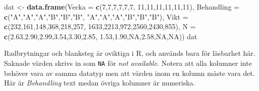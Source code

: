 \documentclass[
]{book}
\newenvironment{Shaded}{\begin{snugshade}}{\end{snugshade}}
\newcommand{\AttributeTok}[1]{\textcolor[rgb]{0.13,0.29,0.53}{#1}}
\newcommand{\ConstantTok}[1]{\textcolor[rgb]{0.56,0.35,0.01}{#1}}
\newcommand{\DecValTok}[1]{\textcolor[rgb]{0.00,0.00,0.81}{#1}}
\newcommand{\FloatTok}[1]{\textcolor[rgb]{0.00,0.00,0.81}{#1}}
\newcommand{\FunctionTok}[1]{\textcolor[rgb]{0.13,0.29,0.53}{\textbf{#1}}}
\newcommand{\NormalTok}[1]{#1}
\newcommand{\OtherTok}[1]{\textcolor[rgb]{0.56,0.35,0.01}{#1}}
\newcommand{\StringTok}[1]{\textcolor[rgb]{0.31,0.60,0.02}{#1}}
\theoremstyle{definition}
\theoremstyle{definition}
\theoremstyle{definition}
\theoremstyle{definition}
\theoremstyle{remark}
\begin{document}
\begin{Shaded}
\begin{Highlighting}[]
\NormalTok{dat }\OtherTok{\textless{}{-}} \FunctionTok{data.frame}\NormalTok{(}\AttributeTok{Vecka =} \FunctionTok{c}\NormalTok{(}\DecValTok{7}\NormalTok{,}\DecValTok{7}\NormalTok{,}\DecValTok{7}\NormalTok{,}\DecValTok{7}\NormalTok{,}\DecValTok{7}\NormalTok{,}\DecValTok{7}\NormalTok{,}
                            \DecValTok{11}\NormalTok{,}\DecValTok{11}\NormalTok{,}\DecValTok{11}\NormalTok{,}\DecValTok{11}\NormalTok{,}\DecValTok{11}\NormalTok{,}\DecValTok{11}\NormalTok{),}
                  \AttributeTok{Behandling =} \FunctionTok{c}\NormalTok{(}\StringTok{"A"}\NormalTok{,}\StringTok{"A"}\NormalTok{,}\StringTok{"A"}\NormalTok{,}\StringTok{"B"}\NormalTok{,}\StringTok{"B"}\NormalTok{,}\StringTok{"B"}\NormalTok{,}
                                 \StringTok{"A"}\NormalTok{,}\StringTok{"A"}\NormalTok{,}\StringTok{"A"}\NormalTok{,}\StringTok{"B"}\NormalTok{,}\StringTok{"B"}\NormalTok{,}\StringTok{"B"}\NormalTok{),}
                  \AttributeTok{Vikt =} \FunctionTok{c}\NormalTok{(}\DecValTok{232}\NormalTok{,}\DecValTok{161}\NormalTok{,}\DecValTok{148}\NormalTok{,}\DecValTok{368}\NormalTok{,}\DecValTok{218}\NormalTok{,}\DecValTok{257}\NormalTok{,}
                           \DecValTok{1633}\NormalTok{,}\DecValTok{2213}\NormalTok{,}\DecValTok{972}\NormalTok{,}\DecValTok{2560}\NormalTok{,}\DecValTok{2430}\NormalTok{,}\DecValTok{855}\NormalTok{),}
                  \AttributeTok{N =} \FunctionTok{c}\NormalTok{(}\FloatTok{2.63}\NormalTok{,}\FloatTok{2.90}\NormalTok{,}\FloatTok{2.99}\NormalTok{,}\FloatTok{3.54}\NormalTok{,}\FloatTok{3.30}\NormalTok{,}\FloatTok{2.85}\NormalTok{,}
                        \FloatTok{1.53}\NormalTok{,}\FloatTok{1.90}\NormalTok{,}\ConstantTok{NA}\NormalTok{,}\FloatTok{2.58}\NormalTok{,}\ConstantTok{NA}\NormalTok{,}\ConstantTok{NA}\NormalTok{))}
\NormalTok{dat}
\end{Highlighting}
\end{Shaded}

Radbrytningar och blanksteg är oviktiga i R, och används bara för läsbarhet här. Saknade värden skrivs in som \texttt{NA} för \emph{not available}. Notera att alla kolumner inte behöver vara av samma datatyp men att värden inom en kolumn måste vara det. Här är \emph{Behandling} text medan övriga kolumner är numeriska.
\end{document}
